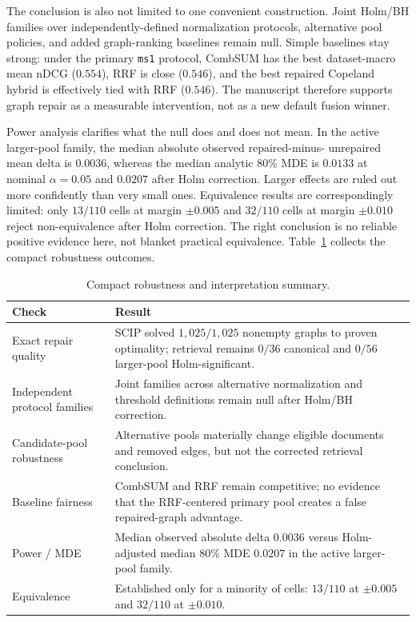 \documentclass[acmsmall,anonymous,review]{acmart}
\begin{document}
The conclusion is also not limited to one convenient construction. Joint
Holm/BH families over independently-defined normalization protocols,
alternative pool policies, and added graph-ranking baselines remain null.
Simple baselines stay strong: under the primary \texttt{ms1} protocol,
CombSUM has the best dataset-macro mean nDCG ($0.554$), RRF is close
($0.546$), and the best repaired Copeland hybrid is effectively tied with
RRF ($0.546$). The manuscript therefore supports graph repair as a
measurable intervention, not as a new default fusion winner.

Power analysis clarifies what the null does and does not mean. In the
active larger-pool family, the median absolute observed repaired-minus-
unrepaired mean delta is $0.0036$, whereas the median analytic 80\% MDE is
$0.0133$ at nominal $\alpha=0.05$ and $0.0207$ after Holm correction.
Larger effects are ruled out more confidently than very small ones.
Equivalence results are correspondingly limited: only $13/110$ cells at
margin $\pm 0.005$ and $32/110$ cells at margin $\pm 0.010$ reject
non-equivalence after Holm correction. The right conclusion is no reliable
positive evidence here, not blanket practical equivalence.
Table~\ref{tab:robustness} collects the compact robustness outcomes.

\begin{table}[t]
  \caption{Compact robustness and interpretation summary.}
  \label{tab:robustness}
  \scriptsize
  \begin{tabular}{p{3.1cm}p{5.9cm}}
    \toprule
    Check & Result \\
    \midrule
    Exact repair quality & SCIP solved $1{,}025/1{,}025$ nonempty graphs to proven optimality; retrieval remains $0/36$ canonical and $0/56$ larger-pool Holm-significant. \\
    Independent protocol families & Joint families across alternative normalization and threshold definitions remain null after Holm/BH correction. \\
    Candidate-pool robustness & Alternative pools materially change eligible documents and removed edges, but not the corrected retrieval conclusion. \\
    Baseline fairness & CombSUM and RRF remain competitive; no evidence that the RRF-centered primary pool creates a false repaired-graph advantage. \\
    Power / MDE & Median observed absolute delta $0.0036$ versus Holm-adjusted median 80\% MDE $0.0207$ in the active larger-pool family. \\
    Equivalence & Established only for a minority of cells: $13/110$ at $\pm 0.005$ and $32/110$ at $\pm 0.010$. \\
    \bottomrule
  \end{tabular}
\end{table}
\end{document}
